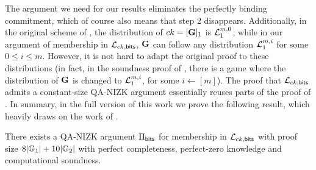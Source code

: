 The argument we need for our results eliminates the perfectly binding commitment, which of course also means that step 2 disappears. Additionally, in the original scheme of \cite{AC:GonHevRaf15}, the distribution of $ck=[\mathbf{{G}}]_1$ is $\mathcal{L}_1^{m,0}$, while in our argument of membership in 
$\mathcal{L}_{ck,\mathsf{bits}}$, $\mathbf{{G}}$ can follow any distribution $\mathcal{L}_1^{m,i}$ for some $0 \leq i \leq m$. 
However, it is not hard to adapt the original proof to these distributions (in fact, in the soundness proof of 
\cite{AC:GonHevRaf15}, there is a game where the distribution of $\mathbf{{G}}$ is changed to $\mathcal{L}_1^{m,i}$, for some $i \gets [m]$). The proof that $\mathcal{L}_{ck,\mathsf{bits}}$ admits a constant-size QA-NIZK argument essentially reuses parts of the proof of \cite{AC:GonHevRaf15}.  In summary, in the full version of this work we prove the following result, which heavily draws on the work of \cite{AC:GonHevRaf15}. 

\begin{theorem} \label{theo:bits} There exists a QA-NIZK argument $\Pi_{\mathsf{bits}}$ for membership in $\mathcal{L}_{ck,\mathsf{bits}}$ with proof size  
$8|\mathbb{G}_1|+10|\mathbb{G}_2|$ with perfect completeness, perfect-zero knowledge and computational soundness. 
\end{theorem}


